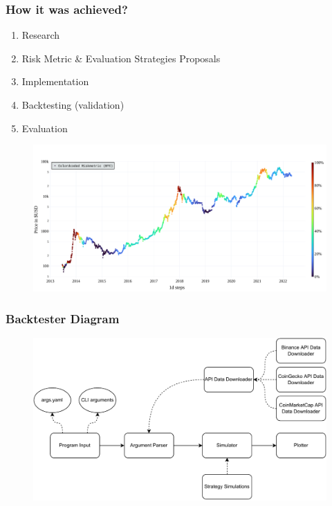 \begin{frame}
  \frametitle{How it was achieved?}

  \begin{enumerate}
    \item Research
    \item Risk Metric \& Evaluation Strategies Proposals
    \item Implementation
    \item Backtesting (validation)
    \item Evaluation
  \end{enumerate}

  \begin{figure}
    \centering
    \includegraphics[width=\textwidth]{img/50week-colorcoded.pdf}
  \end{figure}
\end{frame}

\begin{frame}
  \frametitle{Backtester Diagram}
  \begin{figure}
    \includegraphics[width=\textwidth]{img/structure-diagram.pdf}
  \end{figure}
\end{frame}

